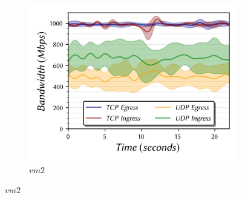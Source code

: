 \documentclass[a4paper,10pt]{article}
\begin{document}
\begin{figure}
\begin{subfigure}{.33\textwidth}
  \includegraphics[width=\hsize]{figs/cluster2/setA/vis-5-vm2-combined.png}
  \caption{$vm2$}
  \label{fig:bw-bidir-2:c}
\end{subfigure}%

\medskip



\end{figure}
\end{document}
